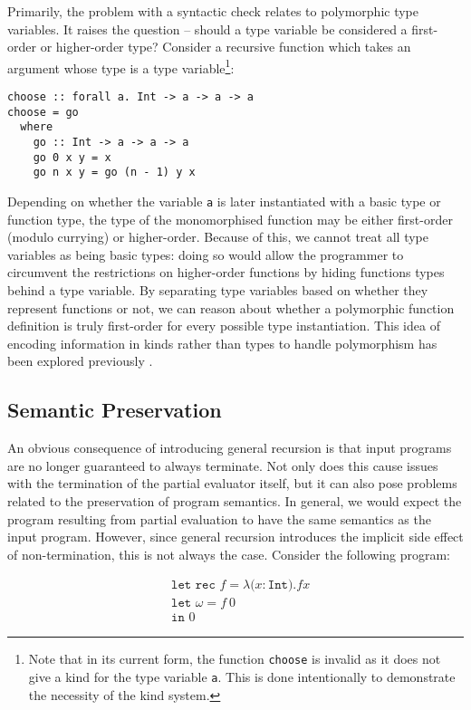 \documentclass[runningheads]{llncs}
\begin{document}
Primarily, the problem with a syntactic check relates to polymorphic type variables. It raises the question -- should a type variable be considered a first-order or higher-order type? Consider a recursive function which takes an argument whose type is a type variable\footnote{Note that in its current form, the function \texttt{choose} is invalid as it does not give a kind for the type variable \texttt{a}. This is done intentionally to demonstrate the necessity of the kind system.}:

\begin{verbatim}
choose :: forall a. Int -> a -> a -> a
choose = go
  where
    go :: Int -> a -> a -> a
    go 0 x y = x
    go n x y = go (n - 1) y x
\end{verbatim}

Depending on whether the variable \texttt{a} is later instantiated with a basic type or function type, the type of the monomorphised function may be either first-order (modulo currying) or higher-order. Because of this, we cannot treat all type variables as being basic types: doing so would allow the programmer to circumvent the restrictions on higher-order functions by hiding functions types behind a type variable. By separating type variables based on whether they represent functions or not, we can reason about whether a polymorphic function definition is truly first-order for every possible type instantiation. This idea of encoding information in kinds rather than types to handle polymorphism has been explored previously \cite{downen2020kinds}.

\subsection{Semantic Preservation}

An obvious consequence of introducing general recursion is that input programs are no longer guaranteed to always terminate. Not only does this cause issues with the termination of the partial evaluator itself, but it can also pose problems related to the preservation of program semantics. In general, we would expect the program resulting from partial evaluation to have the same semantics as the input program. However, since general recursion introduces the implicit side effect of non-termination, this is not always the case. Consider the following program:

\[
  \begin{split}
    &\texttt{let rec $f = \lambda (x : $Int$). f x$} \\
    &\texttt{let $\omega = f\ 0$} \\
    &\texttt{in } 0
  \end{split}
\]
\end{document}
